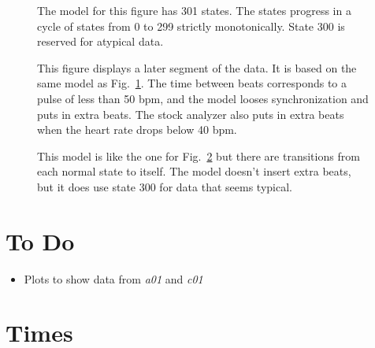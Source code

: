 \documentclass[12pt]{article}
\begin{document}
\begin{figure}
  \centering
    \caption{The model for this figure has 301 states.  The states
      progress in a cycle of states from 0 to 299 strictly
      monotonically.  State 300 is reserved for atypical data.}
  \label{fig:modelAR3_300}
\end{figure}

\begin{figure}
  \centering
    \caption{This figure displays a later segment of the data.  It is
      based on the same model as Fig.~\ref{fig:modelAR3_300}.  The time
      between beats corresponds to a pulse of less than 50 bpm, and the
      model looses synchronization and puts in extra beats.  The stock
      analyzer also puts in extra beats when the heart rate drops
      below 40 bpm.}
  \label{fig:modelAR3_300_double}
\end{figure}

\begin{figure}
  \centering
    \caption{This model is like the one for
      Fig.~\ref{fig:modelAR3_300_double} but there are transitions
      from each normal state to itself.  The model doesn't insert
      extra beats, but it does use state 300 for data that seems
      typical.}
  \label{fig:modelAR3A_300_double}
\end{figure}

\section{To Do}
\label{sec:todo}

\begin{itemize}
\item Plots to show data from \emph{a01} and \emph{c01}
\end{itemize}
\section{Times}
\label{sec:times}
\end{document}
